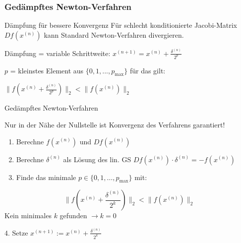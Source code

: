 \subsubsection{Gedämpftes Newton-Verfahren}

\begin{concept}{Dämpfung für bessere Konvergenz}
Für schlecht konditionierte Jacobi-Matrix $Df(x^{(n)})$ kann Standard Newton-Verfahren divergieren. 

Dämpfung = variable Schrittweite:
$x^{(n+1)} = x^{(n)} + \frac{\delta^{(n)}}{2^p}$

$p$ = kleinstes Element aus $\{0, 1, ..., p_{\max}\}$ für das gilt:

$\|f(x^{(n)} + \frac{\delta^{(n)}}{2^p})\|_2 < \|f(x^{(n)})\|_2$
\end{concept}

\begin{KR}{Gedämpftes Newton-Verfahren}

Nur in der Nähe der Nullstelle ist Konvergenz des Verfahrens garantiert!
\begin{enumerate}
    \item Berechne $f(x^{(n)})$ und $D f(x^{(n)})$
    \item Berechne $\delta^{(n)}$ als Lösung des lin. GS $D f(x^{(n)}) \cdot \delta^{(n)}=-f(x^{(n)})$
    \item Finde das minimale $p \in\{0,1, \ldots, p_{\max }\}$ mit:
\end{enumerate}
$$
\|f(x^{(n)}+\frac{\delta^{(n)}}{2^k})\|_2<\|f(x^{(n)})\|_2
$$
Kein minimales $k$ gefunden $\rightarrow k=0$

4. Setze
$
x^{(n+1)}:=x^{(n)}+\frac{\delta^{(n)}}{2^k}
$
\end{KR}







